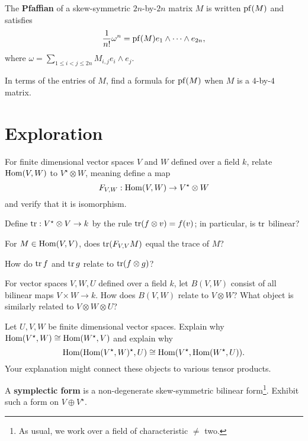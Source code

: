 \documentclass{homework}
\begin{document}
\begin{problem}\label{pfaffian-definition}The \textbf{Pfaffian} of a skew-symmetric $2n$-by-$2n$ matrix $M$ is written $\operatorname{pf}(M)$ and satisfies
  \[
    \frac{1}{n!} \omega^n = \operatorname{pf}(M) e_1 \wedge \cdots \wedge e_{2n},
  \]
  where $\omega = \displaystyle\sum_{1 \leq i < j \leq 2n} M_{i,j} e_i \wedge e_j$.

  In terms of the entries of $M$, find a formula for $\operatorname{pf}(M)$ when $M$
  is a $4$-by-$4$ matrix.
\end{problem}

\section{Exploration}

\begin{problem}\label{tensor-versus-hom}For finite dimensional vector spaces $V$ and $W$ defined over a
  field $k$, relate $\operatorname{Hom}(V,W)$ to $V^\star \otimes W$, meaning define
  a map
  \[
    F_{V,W} : \operatorname{Hom}(V,W) \to V^\star \otimes W
  \]
  and verify that it is isomorphism.
  
  Define $\operatorname{tr} : V^\star \otimes V \to k$ by the rule
  $\operatorname{tr}(f \otimes v) = f(v)$; in particular, is $\operatorname{tr}$ bilinear?

  For $M \in \operatorname{Hom}(V,V)$, does $\operatorname{tr} (F_{V,V} M)$ equal the trace of
  $M$?  
\end{problem}

\begin{problem}\label{trace-of-tensor-product}How do $\operatorname{tr} f$ and $\operatorname{tr} g$ relate to $\operatorname{tr} (f \otimes g)$?
\end{problem}

\begin{problem}\label{tensor-versus-bilinear-forms}For vector spaces $V, W, U$ defined over a field $k$, let $B(V,W)$
  consist of all bilinear maps $V \times W \to k$.  How does $B(V,W)$
  relate to $V \otimes W$?  What object is similarly related to
  $V \otimes W \otimes U$?
\end{problem}

\begin{problem}
  Let $U, V, W$ be finite dimensional vector spaces. Explain why \(\operatorname{Hom}(V^\star,W) \cong \operatorname{Hom}(W^\star,V)\) and explain why
  \[
    \operatorname{Hom}(\operatorname{Hom}(V^\star,W)^\star,U) \cong \operatorname{Hom}(V^\star,\operatorname{Hom}(W^\star,U)).
  \]
  Your explanation might connect these objects to various tensor products.
\end{problem}

\begin{problem}\label{symplectic-form-on-v-plus-v}A \textbf{symplectic form} is a non-degenerate skew-symmetric bilinear form\footnote{As usual, we work over a field of characteristic $\neq$ two.}.  Exhibit such a form on $V \oplus V^\star$.
\end{problem}
\end{document}
